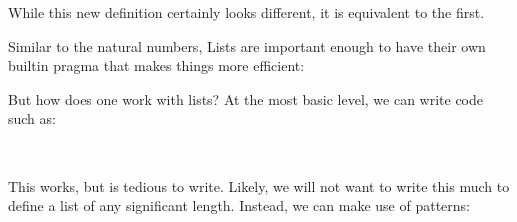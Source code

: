 \documentclass{lecturenotes}
\begin{document}
\noindent While this new definition certainly looks different, it is equivalent to the first. 

\vspace{0.2in}

Similar to the natural numbers, Lists are important enough to have their own builtin pragma that makes things more efficient:

\begin{center}
    \begin{code}%
%
\>[8]\AgdaSymbol{\{-\#}\AgdaSpace{}%
\AgdaSpace{}%
\AgdaSpace{}%
\AgdaSpace{}%
\AgdaSymbol{\#-\}}\<%
\end{code}
\end{center}

But how does one work with lists?
At the most basic level, we can write code such as: 

\begin{center}
    \begin{code}%
%
\>[8]\AgdaFunction{\AgdaUnderscore{}}\AgdaSpace{}%
\AgdaSymbol{:}\AgdaSpace{}%
\AgdaSpace{}%
\<%
\\
%
\>[8]\AgdaSymbol{\AgdaUnderscore{}}\AgdaSpace{}%
\AgdaSymbol{=}\AgdaSpace{}%
\AgdaSpace{}%
\AgdaSpace{}%
\AgdaSpace{}%
\AgdaSpace{}%
\AgdaSpace{}%
\AgdaSpace{}%
\AgdaInductiveConstructor{[]}\<%
\end{code}
\end{center}

This works, but is tedious to write. 
Likely, we will not want to write this much to define a list of any significant length.
Instead, we can make use of patterns:
\end{document}
